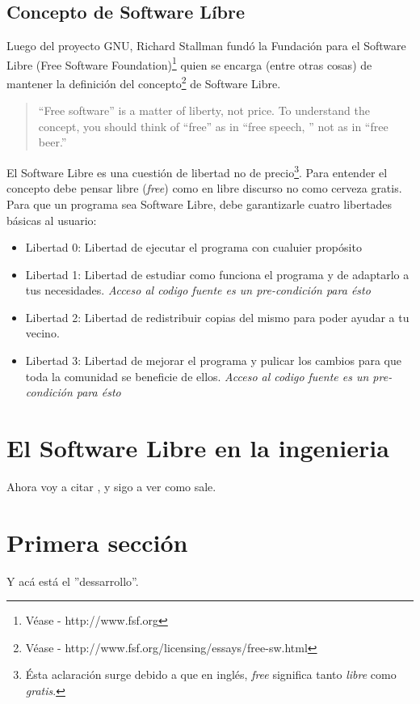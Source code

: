 
\subsection{Concepto de Software L\'ibre}
Luego del proyecto GNU, Richard Stallman fund\'o la Fundaci\'on para el 
Software Libre (Free Software Foundation)\footnote{V\'ease - http://www.fsf.org} 
quien se encarga (entre otras cosas) de mantener la definici\'on del concepto\footnote{V\'ease - http://www.fsf.org/licensing/essays/free-sw.html} de Software Libre.

\begin{quote}
``Free software'' is a matter of liberty, not price. 
To understand the concept, you should think of ``free'' as in ``free speech,
'' not as in ``free beer.''
\end{quote}

El Software Libre es una cuesti\'on de libertad no de precio\footnote{\'Esta
aclaraci\'on surge debido a que en ingl\'es, \emph{free} significa tanto
\emph{libre} como \emph{gratis}.}. Para entender el concepto debe pensar libre
(\emph{free}) como en libre discurso no como cerveza gratis.\\


Para que un programa sea Software Libre, debe garantizarle cuatro libertades
b\'asicas al usuario:

\begin{itemize}
\item Libertad 0: Libertad de ejecutar el programa con cualuier prop\'osito
\item Libertad 1: Libertad de estudiar como funciona el programa y de adaptarlo
a tus necesidades. \emph{Acceso al codigo fuente es un pre-condici\'on para
\'esto}
\item Libertad 2: Libertad de redistribuir copias del mismo para poder ayudar a
tu vecino.
\item Libertad 3: Libertad de mejorar el programa y pulicar los cambios para
que toda la comunidad se beneficie de ellos. \emph{Acceso al codigo fuente es 
un pre-condici\'on para \'esto}
\end{itemize}



\section{El Software Libre en la ingenieria} %
Ahora voy a citar \cite{intro:1}, y sigo a ver como sale.




\section{Primera secci\'on}

Y ac\'a est\'a el ''dessarrollo''.
